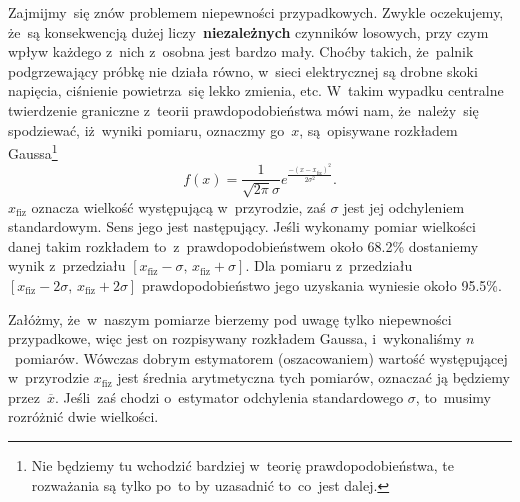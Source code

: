 \documentclass[a4paper,11pt]{article}
\newcommand{\tb}{\textbf}
\begin{document}
Zajmijmy~się znów problemem niepewności przypadkowych. Zwykle
oczekujemy, że~są konsekwencją dużej liczy~\tb{niezależnych} czynników
losowych, przy czym wpływ każdego z~nich z~osobna jest bardzo mały.
Choćby takich, że~palnik podgrzewający próbkę nie działa równo,
w~sieci elektrycznej są drobne skoki napięcia, ciśnienie powietrza~się
lekko zmienia, etc. W~takim wypadku centralne twierdzenie graniczne
z~teorii prawdopodobieństwa mówi nam, że~należy~się spodziewać,
iż~wyniki pomiaru, oznaczmy go~$x$, są~opisywane rozkładem
Gaussa\footnote{Nie będziemy tu wchodzić bardziej w~teorię
  prawdopodobieństwa, te rozważania są tylko po~to by uzasadnić
  to~co~jest dalej.}
\begin{equation}
  \label{eq:4}
  f( x ) = \frac{ 1 }{ \sqrt{ 2 \pi } \sigma }
  e^{ \frac{ -( x - x_{ \mathrm{fiz} } )^{ 2 } }{ 2 \sigma^{ 2 } } }.
\end{equation}
$x_{ \textrm{fiz} }$ oznacza wielkość występującą w~przyrodzie, zaś
$\sigma$ jest jej odchyleniem standardowym. Sens jego jest
następujący. Jeśli wykonamy pomiar wielkości danej takim rozkładem
to~z~prawdopodobieństwem około 68.2\% dostaniemy wynik z~przedziału
$[ x_{ \textrm{fiz} } - \sigma,\, x_{ \textrm{fiz} } + \sigma ]$. Dla
pomiaru z~przedziału
$[ x_{ \textrm{fiz} } - 2\sigma,\, x_{ \textrm{fiz} } + 2\sigma ]$
prawdopodobieństwo jego uzyskania wyniesie około 95.5\%.

Załóżmy, że~w~naszym pomiarze bierzemy pod uwagę tylko niepewności
przypadkowe, więc jest on rozpisywany rozkładem Gaussa, i~wykonaliśmy
$n$~pomiarów. Wówczas dobrym estymatorem (oszacowaniem) wartość
występującej w~przyrodzie $x_{ \textrm{fiz} }$ jest średnia
arytmetyczna tych pomiarów, oznaczać ją będziemy przez~$\overline{x}$.
Jeśli~zaś chodzi o~estymator odchylenia standardowego $\sigma$,
to~musimy rozróżnić dwie wielkości.
\end{document}
